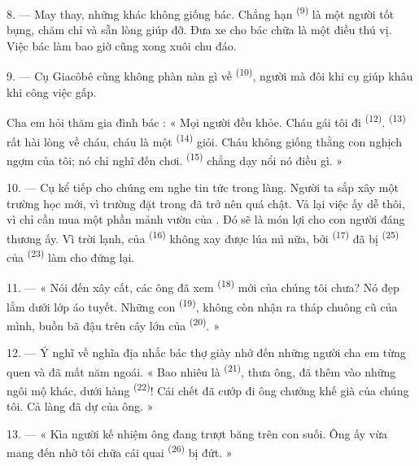 8. --- May thay, những  khác không giống bác. Chẳng hạn
 \textsuperscript{(9)} là một người tốt bụng, chăm chỉ và sẵn
lòng giúp đỡ. Đưa xe cho bác chữa là một điều thú vị. Việc bác làm bao giờ cũng xong
xuôi chu đáo.

9. --- Cụ Giacôbê cũng không phàn nàn gì về 
\textsuperscript{(10)}, người mà đôi khi cụ giúp khâu  khi công
việc gấp.

Cha em hỏi thăm gia đình bác : « Mọi người đều khỏe. Cháu gái tôi đi 
\textsuperscript{(12)}.  \textsuperscript{(13)} rất hài lòng về cháu,
cháu là một  \textsuperscript{(14)} giỏi. Cháu không giống thằng con
nghịch ngợm của tôi; nó chỉ nghĩ đến chơi. 
\textsuperscript{(15)} chẳng dạy nổi nó điều gì. »

\VUsaut{3.0mm}
\VUsaut{3.0mm}

10. --- Cụ kể tiếp cho chúng em nghe tin tức trong làng. Người ta sắp xây một trường học
mới, vì trường đặt trong  đã trở nên quá chật. Vả lại việc ấy dễ
thôi, vì chỉ cần mua một phần mảnh vườn của . Đó sẽ là món lợi cho
con người đáng thương ấy. Vì trời lạnh,  của 
\textsuperscript{(16)} không xay được lúa mì nữa, bởi 
\textsuperscript{(17)} đã bị  \textsuperscript{(25)} của 
\textsuperscript{(23)} làm cho đứng lại.

11. --- « Nói đến xây cất, các ông đã xem  \textsuperscript{(18)} mới
của chúng tôi chưa? Nó đẹp lắm dưới lớp áo tuyết. Những con 
\textsuperscript{(19)}, không còn nhận ra tháp chuông cũ của mình, buồn bã đậu trên cây
lớn của  \textsuperscript{(20)}. »

12. --- Ý nghĩ về nghĩa địa nhắc bác thợ giày nhớ đến những người cha em từng quen và đã
mất năm ngoái. « Bao nhiêu là  \textsuperscript{(21)}, thưa ông, đã thêm
vào những ngôi mộ khác, dưới hàng  \textsuperscript{(22)}! Cái chết đã
cướp đi ông chưởng khế già của chúng tôi. Cả làng đã dự  của ông. »

13. --- « Kìa người kế nhiệm ông đang trượt băng trên con suối. Ông ấy vừa mang đến nhờ
tôi chữa cái quai  \textsuperscript{(26)} bị đứt. »

